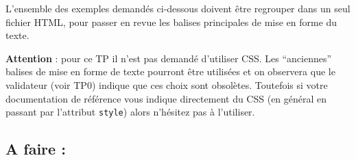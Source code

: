 \documentclass[a4paper,11pt]{article}
\begin{document}
L'ensemble des exemples demandés ci-dessous doivent être regrouper dans un seul fichier HTML, pour passer en revue les balises principales de mise en forme du texte.

\textcolor{rougetitre}{\textbf{Attention}} : pour ce TP il n'est pas demandé d'utiliser CSS. Les ``anciennes'' balises de mise en forme de texte pourront être utilisées et on observera que le validateur (voir TP0) indique que ces choix sont obsolètes. Toutefois si votre documentation de référence vous indique directement du CSS (en général en passant par l'attribut \texttt{style}) alors n'hésitez pas à l'utiliser.

\subsection{A faire :}
\end{document}
